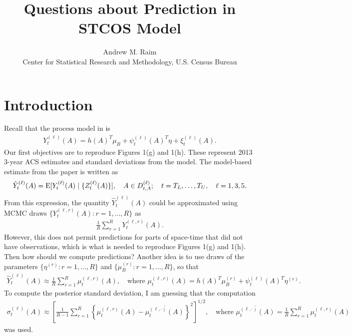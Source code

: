 \documentclass[10pt]{article}
\title{Questions about Prediction in STCOS Model}
\author{Andrew M. Raim
\vspace{0.5em} \\
Center for Statistical Research and Methodology, U.S. Census Bureau
}
\begin{document}
\maketitle

\section{Introduction}
\label{sec:intro}
Recall that the process model in \citet{BradleyEtAl2016-STAT} is
%
\begin{align*}
Y_t^{(\ell)}(A) = h(A)^T \mu_B + \psi_t^{(\ell)}(A)^T \eta + \xi_t^{(\ell)}(A).
\end{align*}
%
Our first objectives are to reproduce Figures 1(g) and 1(h). These represent 2013 3-year ACS estimates and standard deviations from the model. The model-based estimate from the paper is written as
%
\begin{align*}
\hat{Y}_t^{(\ell)}(A) = \operatorname{E}[ Y_t^{(\ell)}(A) \mid \{ Z_t^{(\ell)}(A) \} ],
\quad A \in D_{t,A}^{(\ell)};
\quad t = T_L, \ldots, T_U, 
\quad \ell = 1,3,5.
\end{align*}
%
From this expression, the quantity $\hat{Y}_t^{(\ell)}(A)$ could be approximated using MCMC draws $\{ Y_t^{(\ell, r)}(A) : r = 1, \ldots, R \}$ as
%
\begin{align*}
\frac{1}{R} \sum_{r=1}^R Y_t^{(\ell, r)}(A).
\end{align*}
%
However, this does not permit predictions for parts of space-time that did not have observations, which is what is needed to reproduce Figures 1(g) and 1(h). Then how should we compute predictions? Another idea is to use draws of the parameters $\{ \eta^{(r)} : r = 1, \ldots, R \}$ and $\{ \mu_B^{(r)} : r = 1, \ldots, R \}$, so that
%
\begin{align}
\hat{Y}_t^{(\ell)}(A) \approx \frac{1}{R} \sum_{r=1}^R \mu_t^{(\ell, r)}(A), \quad
\text{where $\mu_t^{(\ell, r)}(A) = h(A)^T \mu_B^{(r)} + \psi_t^{(\ell)}(A)^T \eta^{(r)}$}.
\label{eqn:predict-mcmc}
\end{align}
%
To compute the posterior standard deviation, I am guessing that the computation
\begin{align*}
\sigma_t^{(\ell)}(A) \approx \left[
\frac{1}{R-1} \sum_{r=1}^R \left\{ \mu_t^{(\ell, r)}(A) - \overline{\mu_t^{(\ell, \cdot)}(A)} \right\}^2
\right]^{1/2}, \quad
\text{where $\overline{\mu_t^{(\ell, \cdot)}(A)} = \frac{1}{R} \sum_{r=1}^R \mu_t^{(\ell, r)}(A)$}
\end{align*}
%
was used.
\end{document}
